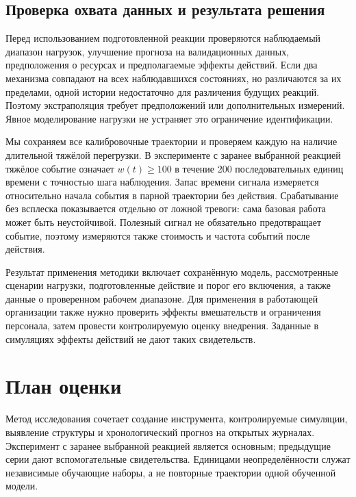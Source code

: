 \documentclass[runningheads]{llncs}
\begin{document}
\subsection{Проверка охвата данных и результата решения}
Перед использованием подготовленной реакции проверяются наблюдаемый диапазон нагрузок, улучшение прогноза на валидационных данных, предположения о ресурсах и предполагаемые эффекты действий. Если два механизма совпадают на всех наблюдавшихся состояниях, но различаются за их пределами, одной истории недостаточно для различения будущих реакций. Поэтому экстраполяция требует предположений или дополнительных измерений. Явное моделирование нагрузки не устраняет это ограничение идентификации.

Мы сохраняем все калибровочные траектории и проверяем каждую на наличие длительной тяжёлой перегрузки. В эксперименте с заранее выбранной реакцией тяжёлое событие означает $w(t)\geq100$ в течение 200 последовательных единиц времени с точностью шага наблюдения. Запас времени сигнала измеряется относительно начала события в парной траектории без действия. Срабатывание без всплеска показывается отдельно от ложной тревоги: сама базовая работа может быть неустойчивой. Полезный сигнал не обязательно предотвращает событие, поэтому измеряются также стоимость и частота событий после действия.

Результат применения методики включает сохранённую модель, рассмотренные сценарии нагрузки, подготовленные действие и порог его включения, а также данные о проверенном рабочем диапазоне. Для применения в работающей организации также нужно проверить эффекты вмешательств и ограничения персонала, затем провести контролируемую оценку внедрения. Заданные в симуляциях эффекты действий не дают таких свидетельств.

\section{План оценки}
Метод исследования сочетает создание инструмента, контролируемые симуляции, выявление структуры и хронологический прогноз на открытых журналах. Эксперимент с заранее выбранной реакцией является основным; предыдущие серии дают вспомогательные свидетельства. Единицами неопределённости служат независимые обучающие наборы, а не повторные траектории одной обученной модели.
\end{document}
